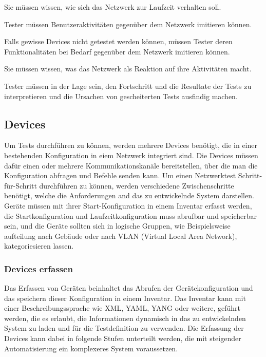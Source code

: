 \documentclass[
	ngerman,
	toc=listof, %
	toc=bibliography, %
	footnotes=multiple, %
	parskip=half, %
	numbers=noendperiod %
]{scrartcl}
\begin{document}
			Sie müssen wissen, wie sich das Netzwerk zur Laufzeit verhalten soll.

			Tester müssen Benutzeraktivitäten gegenüber dem Netzwerk imitieren können.

			Falls gewisse Devices nicht getestet werden können, müssen Tester deren Funktionalitäten bei Bedarf gegenüber dem Netzwerk imitieren können.

			Sie müssen wissen, was das Netzwerk als Reaktion auf ihre Aktivitäten macht.

			Tester müssen in der Lage sein, den Fortschritt und die Resultate der Tests zu interpretieren und die Ursachen von gescheiterten Tests ausfindig machen.


	\subsection{Devices}
	Um Tests durchführen zu können, werden mehrere Devices benötigt, die in einer bestehenden Konfiguration in eiem Netzwerk integriert sind.
	Die Devices müssen dafür einen oder mehrere Kommunikationskanäle bereitstellen, über die man die Konfiguration abfragen und Befehle senden kann.
	Um einen Netzwerktest Schritt-für-Schritt durchführen zu können, werden verschiedene Zwischenschritte benötigt, welche die Anforderungen and das zu entwickelnde System darstellen.
	Geräte müssen mit ihrer Start-Konfiguration in einem Inventar erfasst werden, die Startkonfiguration und Laufzeitkonfiguration muss abrufbar und speicherbar sein,
	und die Geräte sollten sich in logische Gruppen, wie Beispielsweise aufteilung nach Gebäude oder nach VLAN (Virtual Local Area Network), kategoriesieren lassen.

		\subsubsection{Devices erfassen}
			Das Erfassen von Geräten beinhaltet das Abrufen der Gerätekonfiguration und das speichern dieser Konfiguration in einem Inventar. 
			Das Inventar kann mit einer Beschreibungssprache wie XML, YAML, YANG oder weitere, geführt werden, die es erlaubt, die Informationen dynamisch in das zu entwickelnden System zu laden und für die Testdefinition zu verwenden.
			Die Erfassung der Devices kann dabei in folgende Stufen unterteilt werden, die mit steigender Automatisierung ein komplexeres System voraussetzen.
\end{document}
